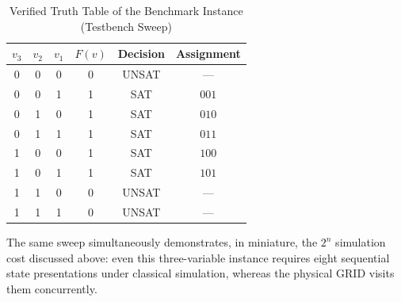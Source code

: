 \documentclass[letterpaper,journal]{IEEEtran}
\begin{document}
\begin{table}[!t]
\centering
\caption{Verified Truth Table of the Benchmark Instance (Testbench Sweep)}
\label{tab:truth}
\begin{tabular}{cccccc}
\toprule
$v_3$ & $v_2$ & $v_1$ & $F(v)$ & \textbf{Decision} & \textbf{Assignment} \\
\midrule
0 & 0 & 0 & 0 & UNSAT & --- \\
0 & 0 & 1 & 1 & SAT & $001$ \\
0 & 1 & 0 & 1 & SAT & $010$ \\
0 & 1 & 1 & 1 & SAT & $011$ \\
1 & 0 & 0 & 1 & SAT & $100$ \\
1 & 0 & 1 & 1 & SAT & $101$ \\
1 & 1 & 0 & 0 & UNSAT & --- \\
1 & 1 & 1 & 0 & UNSAT & --- \\
\bottomrule
\end{tabular}
\end{table} The same sweep simultaneously
demonstrates, in miniature, the $2^{n}$ simulation cost discussed above:
even this three-variable instance requires eight sequential state
presentations under classical simulation, whereas the physical GRID visits
them concurrently.
\end{document}

